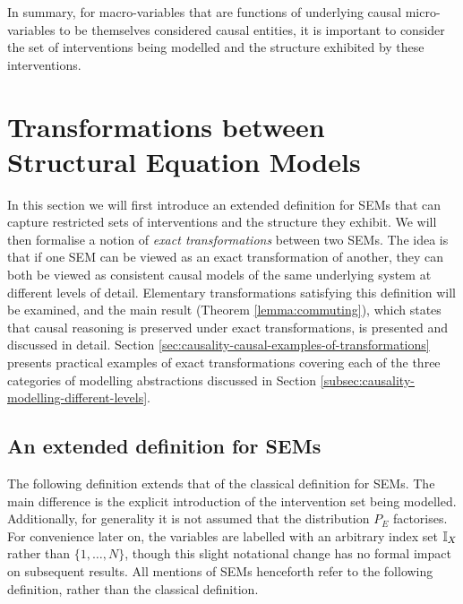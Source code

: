 In summary, for macro-variables that are functions of underlying causal micro-variables to be themselves considered causal entities, it is important to consider the set of interventions being modelled and the structure exhibited by these interventions.


\section{Transformations between Structural Equation Models}\label{sec:causality-transformations-between-sems}

In this section we will first introduce an extended definition for SEMs that can capture restricted sets of interventions and the structure they exhibit.
We will then formalise a notion of \emph{exact transformations} between two SEMs. 
The idea is that if one SEM can be viewed as an exact transformation of another, they can both be viewed as consistent causal models of the same underlying system at different levels of detail. 
Elementary transformations satisfying this definition will be examined, and the main result (Theorem \ref{lemma:commuting}), which states that causal reasoning is preserved under exact transformations, is presented and discussed in detail.
Section \ref{sec:causality-causal-examples-of-transformations} presents practical examples of exact transformations covering each of the three categories of modelling abstractions discussed in Section \ref{subsec:causality-modelling-different-levels}.


\subsection{An extended definition for SEMs}

The following definition extends that of the classical definition for SEMs. 
The main difference is the explicit introduction of the intervention set being modelled.
Additionally, for generality it is not assumed that the distribution $P_E$ factorises.
For convenience later on, the variables are labelled with an arbitrary index set $\mathbb{I}_X$ rather than $\{1,\ldots, N\}$, though this slight notational change has no formal impact on subsequent results.
All mentions of SEMs henceforth refer to the following definition, rather than the classical definition.

\medskip

